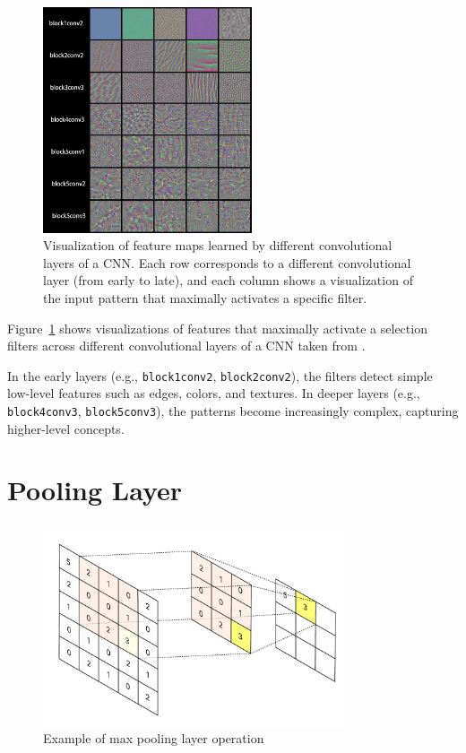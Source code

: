 \documentclass{pracalicmgr}
\begin{document}
\begin{figure}[H]
    \centering
    \includegraphics[width=0.55\textwidth]{src/convViz.png}
    \caption{Visualization of feature maps learned by different convolutional layers of a CNN. Each row corresponds to a different convolutional layer (from early to late), and each column shows a visualization of the input pattern that maximally activates a specific filter. \cite{exCNN}}
    \label{fig:convviz}
\end{figure}

Figure~\ref{fig:convviz} shows visualizations of features that maximally activate a selection filters across different convolutional layers of a CNN taken from \cite{activations}.

In the early layers (e.g., \texttt{block1conv2}, \texttt{block2conv2}), the filters detect simple low-level features such as edges, colors, and textures. In deeper layers (e.g., \texttt{block4conv3}, \texttt{block5conv3}), the patterns become increasingly complex, capturing higher-level concepts.

\section{Pooling Layer}

\begin{figure}[H]
    \centering
    \includegraphics[width=0.8\textwidth]{src/pool1.pdf}
    \caption{Example of max pooling layer operation \cite{Yamashita2018}}
\end{figure}
\end{document}
